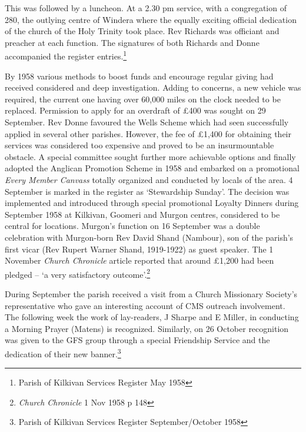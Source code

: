 This was followed by a luncheon. At a 2.30 pm service, with a congregation of 280, the outlying centre of Windera where the equally exciting official dedication of the church of the Holy Trinity took place. Rev Richards was officiant and preacher at each function. The signatures of both Richards and Donne accompanied the register entries.\footnote{Parish of Kilkivan Services Register May 1958}


By 1958 various methods to boost funds and encourage regular giving had received considered and deep investigation. Adding to concerns, a new vehicle was required, the current one having over 60,000 miles on the clock needed to be replaced. Permission to apply for an overdraft of \pounds400 was sought on 29 September. Rev Donne favoured the Wells Scheme which had seen successfully applied in several other parishes. However, the fee of \pounds1,400 for obtaining their services was considered too expensive and proved to be an insurmountable obstacle. A special committee sought further more achievable options and finally adopted the Anglican Promotion Scheme in 1958 and embarked on a promotional \emph{Every Member Canvass} totally organized and conducted by locals of the area. 4 September is marked in the register as `Stewardship Sunday'. The decision was implemented and introduced through special promotional Loyalty Dinners during September 1958 at Kilkivan, Goomeri and Murgon centres, considered to be central for locations. Murgon's function on 16 September was a double celebration with Murgon-born Rev David Shand (Nambour), son of the parish's first vicar (Rev Rupert Warner Shand, 1919-1922) as guest speaker. The 1 November \emph{Church Chronicle} article reported that around \pounds1,200 had been pledged -- `a very satisfactory outcome'.\footnote{\emph{Church Chronicle} 1 Nov 1958 p 148}


During September the parish received a visit from a Church Missionary Society's representative who gave an interesting account of CMS outreach involvement. The following week the work of lay-readers, J Sharpe and E Miller, in conducting a Morning Prayer (Matens) is recognized. Similarly, on 26 October recognition was given to the GFS group through a special Friendship Service and the dedication of their new banner.\footnote{Parish of Kilkivan Services Register September/October 1958}








